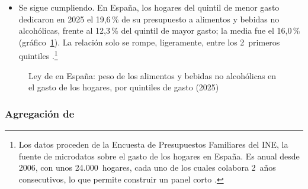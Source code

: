 \documentclass[11pt]{article}
\begin{document}
\begin{itemize}
  \begin{itemize}
  \item Se sigue cumpliendo. En España, los hogares del quintil de menor gasto dedicaron en 2025 el 19,6\,\% de su presupuesto a alimentos y bebidas no alcohólicas, frente al 12,3\,\% del quintil de mayor gasto; la media fue el 16,0\,\% (gráfico~\ref{fig:epf-alimentos-quintil}). La relación solo se rompe, ligeramente, entre los 2~primeros quintiles \parencite{INE2026EPFTabla73828,INE2026EPF}.\footnote{Los datos proceden de la Encuesta de Presupuestos Familiares del INE, la fuente de microdatos sobre el gasto de los hogares en España. Es anual desde 2006, con unos 24.000~hogares, cada uno de los cuales colabora 2~años consecutivos, lo que permite construir un panel corto \parencite{INE2008EPFCaracteristicas,INEEPFMetodologia}.}
  \end{itemize}
\end{itemize}

\begin{figure}[H]
\centering
\caption{Ley de  en España: peso de los alimentos y bebidas no alcohólicas en el gasto de los hogares, por quintiles de gasto (2025)}\label{fig:epf-alimentos-quintil}
\end{figure}

\subsubsection{Agregación de }\label{sec:agregacion-engel}
\end{document}
